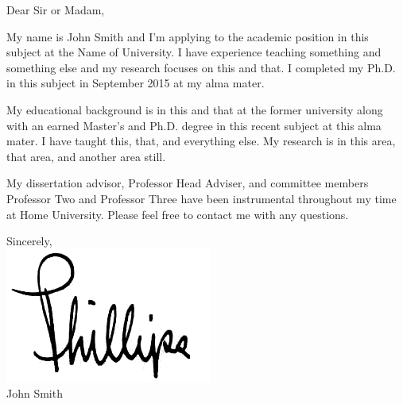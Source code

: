 \documentclass[letterpaper,11pt,oneside]{article}
\begin{document}
\vspace{2em}

Dear Sir or Madam, \\

\vspace{1em}
\onehalfspacing

My name is John Smith and I'm applying to the academic position in this subject at the Name of University. I have experience teaching something and something else and my research focuses on this and that. I completed my Ph.D. in this subject in September 2015 at my alma mater.

\vspace{1em}

My educational background is in this and that at the former university along with an earned Master's and Ph.D. degree in this recent subject at this alma mater. I have taught this, that, and everything else. My research is in this area, that area, and another area still.

\vspace{1em}

My dissertation advisor, Professor Head Adviser, and committee members Professor Two and Professor Three have been instrumental throughout my time at Home University. Please feel free to contact me with any questions.

\vspace{1em}

\begin{flushright}
Sincerely, \\
\vspace{1em}
\includegraphics[scale=0.4]{Phillips} \\ %
\vspace{1em}
John Smith \\
\end{flushright}
\end{document}
